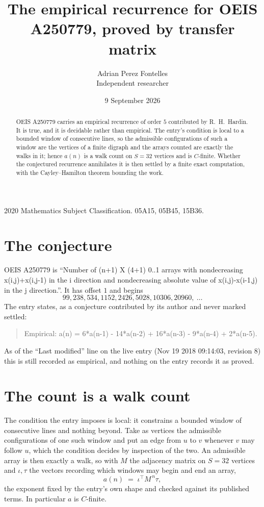 \documentclass[11pt,a4paper]{article}
\title{The empirical recurrence for OEIS A250779, proved by transfer matrix}
\author{Adrian Perez Fontelles\\ \small Independent researcher}
\date{9 September 2026}
\theoremstyle{plain}
\theoremstyle{definition}
\begin{document}
\maketitle

\begin{abstract}
OEIS A250779 carries an empirical recurrence of order $5$ contributed by R.~H.~Hardin. It is
true, and it is decidable rather than empirical. The entry's condition is local to a bounded window of consecutive lines, so
the admissible configurations of such a window are the vertices of a finite digraph and the
arrays counted are exactly the walks in it; hence $a(n)$ is a walk count on $S=32$ vertices
and is $C$-finite. Whether the conjectured recurrence annihilates it is then settled by a
finite exact computation, with the Cayley--Hamilton theorem bounding the work.
\end{abstract}

\noindent\small 2020 Mathematics Subject Classification. 05A15, 05B45, 15B36.\normalsize

\section{The conjecture}

OEIS A250779 is ``Number of (n+1) X (4+1) 0..1 arrays with nondecreasing x(i,j)+x(i,j-1) in the i direction and nondecreasing absolute value of x(i,j)-x(i-1,j) in the j direction.''. It has offset $1$ and begins
\[
99, 238, 534, 1152, 2426, 5028, 10306, 20960,\ \dots
\]
The entry states, as a conjecture contributed by its author and never marked settled:
\begin{quote}
Empirical: a(n) = 6*a(n-1) - 14*a(n-2) + 16*a(n-3) - 9*a(n-4) + 2*a(n-5).
\end{quote}
As of the ``Last modified'' line on the live entry (Nov 19 2018 09:14:03, revision 8) this is still
recorded as empirical, and nothing on the entry records it as proved.

\section{The count is a walk count}

The condition the entry imposes is local: it constrains a bounded window of consecutive lines and nothing beyond. Take as
vertices the admissible configurations of one such window and put an edge from $u$ to $v$
whenever $v$ may follow $u$, which the condition decides by inspection of the two. An
admissible array is then exactly a walk, so with $M$ the adjacency matrix on $S=32$ vertices
and $\iota,\tau$ the vectors recording which windows may begin and end an array,
\[
a(n)\;=\;\iota^{\!\top}M^{\,n}\tau ,
\]
the exponent fixed by the entry's own shape and checked against its published terms. In
particular $a$ is $C$-finite.
\end{document}
